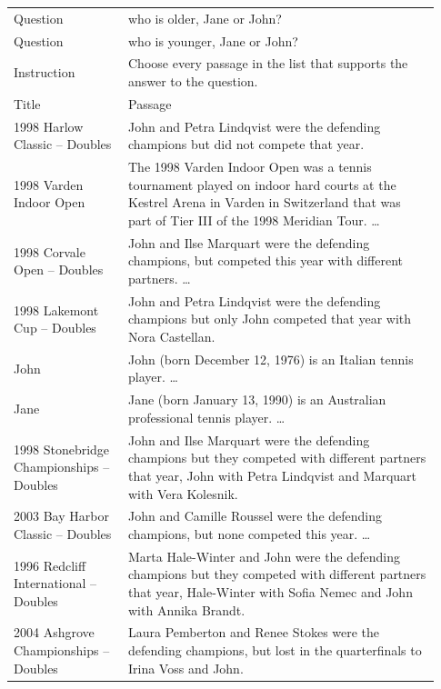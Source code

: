 \begin{tabular}{@{}p{0.25\linewidth}p{0.68\linewidth}@{}}
\toprule
Question & who is older, Jane or John? \\
Question & who is younger, Jane or John? \\
Instruction & Choose every passage in the list that supports the answer to the question. \\
\midrule
Title & Passage \\
\midrule
1998 Harlow Classic -- Doubles & John and Petra Lindqvist were the defending champions but did not compete that year. \\
1998 Varden Indoor Open & The 1998 Varden Indoor Open was a tennis tournament played on indoor hard courts at the Kestrel Arena in Varden in Switzerland that was part of Tier III of the 1998 Meridian Tour.  \ldots \\
1998 Corvale Open -- Doubles & John and Ilse Marquart were the defending champions, but competed this year with different partners.  \ldots \\
1998 Lakemont Cup -- Doubles & John and Petra Lindqvist were the defending champions but only John competed that year with Nora Castellan. \\
John & John (born December 12, 1976) is an Italian tennis player.  \ldots \\
Jane & Jane (born January 13, 1990) is an Australian professional tennis player.  \ldots \\
1998 Stonebridge Championships -- Doubles & John and Ilse Marquart were the defending champions but they competed with different partners that year, John with Petra Lindqvist and Marquart with Vera Kolesnik. \\
2003 Bay Harbor Classic -- Doubles & John and Camille Roussel were the defending champions, but none competed this year.  \ldots \\
1996 Redcliff International -- Doubles & Marta Hale-Winter and John were the defending champions but they competed with different partners that year, Hale-Winter with Sofia Nemec and John with Annika Brandt. \\
2004 Ashgrove Championships -- Doubles & Laura Pemberton and Renee Stokes were the defending champions, but lost in the quarterfinals to Irina Voss and John. \\
\bottomrule
\end{tabular}
